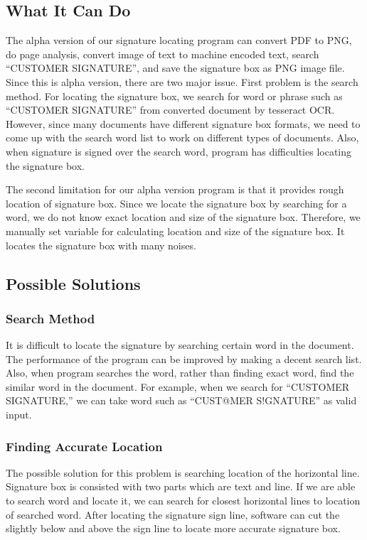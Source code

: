 \documentclass[onecolumn, draftclsnofoot,10pt, compsoc]{IEEEtran}
\begin{document}
\subsection{What It Can Do}
The alpha version of our signature locating program can convert PDF to PNG, do page analysis, convert image of text to machine encoded text, search “CUSTOMER SIGNATURE”, and save the signature box as PNG image file. Since this is alpha version, there are two major issue. First problem is the search method. For locating the signature box, we search for word or phrase such as “CUSTOMER SIGNATURE” from converted document by tesseract OCR. However, since many documents have different signature box formats, we need to come up with the search word list to work on different types of documents. Also, when signature is signed over the search word, program has difficulties locating the signature box.

The second limitation for our alpha version program is that it provides rough location of signature box. Since we locate the signature box by searching for a word, we do not know exact location and size of the signature box. Therefore, we manually set variable for calculating location and size of the signature box. It locates the signature box with many noises.

\subsection{Possible Solutions}
\subsubsection{Search Method}
It is difficult to locate the signature by searching certain word in the document. The performance of the program can be improved by making a decent search list. Also, when program searches the word, rather than finding exact word, find the similar word in the document. For example, when we search for “CUSTOMER SIGNATURE,” we can take word such as “CUST@MER S!GNATURE” as valid input.

\subsubsection{Finding Accurate Location}
The possible solution for this problem is searching location of the horizontal line. Signature box is consisted with two parts which are text and line. If we are able to search word and locate it, we can search for closest horizontal lines to location of searched word. After locating the signature sign line, software can cut the slightly below and above the sign line to locate more accurate signature box.
\end{document}

